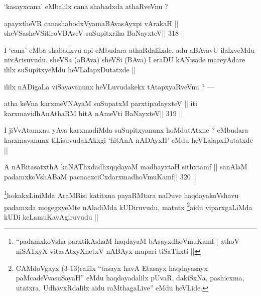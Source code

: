 \begin{artha}
`kasayxcana' eMbalilx cana shabadxda athaRveVnu ?
\end{artha}

\begin{shl}
apayxtheVR canashabodxV\s yamaBAvasAyxpi vArakaH ||
sheVSasheVSitiroVBAveV suSupitxriha BaNayxteV\hfill || 318 ||
\end{shl}

\begin{artha}
I `cana' eMba shabadxvu api eMbudara athaRdalilxde. adu aBAvavU ilalxveMdu nivArisuvudu. sheVSa (aBAva) sheVSi (BAva) I eraDU kANisade mareyAdare ililx suSupitxyeMdu heVLalapxDutatxde ||
\end{artha}

\begin{artha}
ililx nADigaLa viSayavanunx heVLuvudakekx tAtapxyaRveVnu ? ---
\end{artha}

\begin{shl}
atha keVna karxmeVNAyaM suSupatxM parxtipadayxteV ||
iti karxmavidhAnAthaRM hitA nAmeVti BaNayxteV\hfill || 319 ||
\end{shl}

\begin{artha}
I jiVvAtamxnu yAva karxmadiMda suSupitxyanunx hoMdutAtxne ? eMbudara karxmavanunx tiLisuvudakAkxgi `hitAnA nADAyxH' eMdu heVLalapxDutatxde ||
\end{artha}

\begin{shl}
A nABitasatxthA kaNAThxdadhxqqdayaM madhayxtaH sithxtamf ||
sanAlaM padamxkoVshABaM pacnacxciCxdarxmadhoVmuKamf\hfill || 320 ||
\end{shl}

\begin{artha}
\footnote[1]{``padamxkoVsha parxtikAshaM haqdayaM bAsayxdhoVmuKamf | athoV niSATxyX vitasAtxyXnetxV nABAyx mupari tiSaThxti ||}hokakxLiniMda AraMBisi katitxna payaRMtara naDuve haqdayakoVshavu padamxda mogegxyeMte nAladiMda kUDiruvudu, matutx \footnote[2]{CAMdoVgayx (3-13)ralilx ``tasayx havA Etasayx haqdayasayx paMcadeVvasuSayaH'' eMdu haqdayadalilx pUvaR, dakiSxNa, pashicxma, utatxra, UdhavxRdalilx aidu raMthagaLive'' eMdu heVLide.}aidu viparxgaLiMda kUDi keLamuKavAgiruvudu ||
\end{artha}

